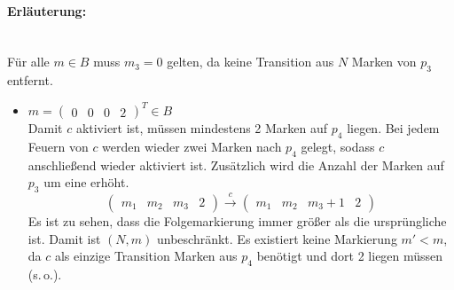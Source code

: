 \documentclass[a4paper]{scrartcl}
\begin{document}
\begin{enumerate}
        \paragraph{Erläuterung:} \hfill \\
        Für alle $m \in B$ muss $m_3 = 0$ gelten, da keine Transition aus $N$
        Marken von $p_3$ entfernt.
        \begin{itemize}
            \item $m = \begin{pmatrix} 0 & 0 & 0 & 2 \end{pmatrix}^T \in B$ \\
                Damit $c$ aktiviert ist, müssen mindestens 2 Marken auf $p_4$
                liegen.
                Bei jedem Feuern von $c$ werden wieder zwei Marken nach $p_4$
                gelegt, sodass $c$ anschließend wieder aktiviert ist.
                Zusätzlich wird die Anzahl der Marken auf $p_3$ um eine erhöht.
                \begin{equation}
                    \begin{pmatrix}
                        m_1 & m_2 & m_3 & 2
                    \end{pmatrix}
                    \stackrel{c}{\to}
                    \begin{pmatrix}
                        m_1 & m_2 & m_3 + 1 & 2
                    \end{pmatrix}
                \end{equation}
                Es ist zu sehen, dass die Folgemarkierung immer größer als die
                ursprüngliche ist.
                Damit ist $(N, m)$ unbeschränkt.
                Es existiert keine Markierung $m' < m$, da $c$ als einzige
                Transition Marken aus $p_4$ benötigt und dort 2 liegen müssen
                (s.\,o.).


\end{itemize}
\end{enumerate}
\end{document}
